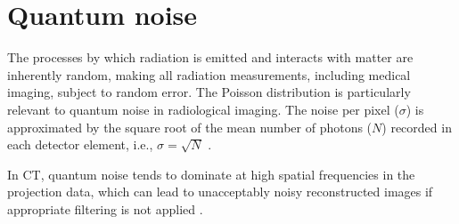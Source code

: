 \section{Quantum noise}

The processes by which radiation is emitted and interacts with matter
are inherently random, making all radiation measurements, including
medical imaging, subject to random error. The Poisson distribution is
particularly relevant to quantum noise in radiological imaging. The
noise per pixel ($\sigma$) is approximated by the square root of the
mean number of photons ($N$) recorded in each detector element, i.e.,
$\sigma = \sqrt{N}$ \cite{bushberg2011essential}.

In CT, quantum noise tends to dominate at high spatial frequencies in
the projection data, which can lead to unacceptably noisy
reconstructed images if appropriate filtering is not applied
\cite{bushberg2011essential}.

